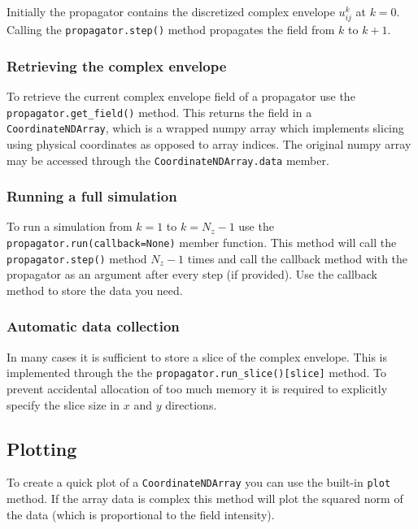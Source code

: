 Initially the propagator contains the discretized complex envelope $u_{ij}^k$ at $k = 0$. Calling the \lstinline{propagator.step()} method propagates the field from $k$ to $k+1$. 

\subsubsection{Retrieving the complex envelope}

To retrieve the current complex envelope field of a propagator use the \lstinline{propagator.get_field()} method. This returns the field in a \lstinline{CoordinateNDArray}, which is a wrapped numpy array which implements slicing using physical coordinates as opposed to array indices. The original numpy array may be accessed through the \lstinline{CoordinateNDArray.data} member.

\subsubsection{Running a full simulation}

To run a simulation from $k=1$ to $k=N_z-1$ use the \lstinline{propagator.run(callback=None)} member function. This method will call the \lstinline{propagator.step()} method $N_z-1$ times and call the callback method with the propagator as an argument after every step (if provided). Use the callback method to store the data you need. 

\subsubsection{Automatic data collection}

In many cases it is sufficient to store a slice of the complex envelope. This is implemented through the the \lstinline{propagator.run_slice()[slice]} method. To prevent accidental allocation of too much memory it is required to explicitly specify the slice size in $x$ and $y$ directions.  

\subsection{Plotting}

To create a quick plot of a \lstinline{CoordinateNDArray} you can use the built-in \lstinline{plot} method. If the array data is complex this method will plot the squared norm of the data (which is proportional to the field intensity).












